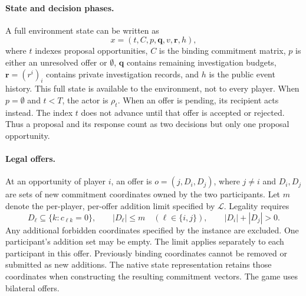 \paragraph{State and decision phases.}
A full environment state can be written as
\begin{equation}
 x=(t,C,p,\mathbf q,v,\mathbf r,h),
 \label{eq:game-full-state}
\end{equation}
where $t$ indexes proposal opportunities, $C$ is the binding commitment
matrix, $p$ is either an unresolved offer or $\emptyset$, $\mathbf q$
contains remaining investigation budgets, $\mathbf r=(r^i)_i$ contains
private investigation records, and $h$ is the public event history.
This full state is available to the environment, not to every player.
When $p=\emptyset$ and $t<T$, the actor is $\rho_t$. When an offer is
pending, its recipient acts instead. The index $t$ does not advance until
that offer is accepted or rejected. Thus a proposal and its response count
as two decisions but only one proposal opportunity.

\paragraph{Legal offers.}
At an opportunity of player $i$, an offer is
$o=(j,D_i,D_j)$, where $j\ne i$ and $D_i,D_j$ are sets of new commitment
coordinates owned by the two participants. Let $m$ denote the per-player,
per-offer addition limit specified by $\mathcal L$. Legality requires
\begin{equation}
 D_\ell\subseteq\{k:c_{\ell k}=0\},\qquad
 |D_\ell|\leq m\quad(\ell\in\{i,j\}),\qquad
 |D_i|+|D_j|>0.
 \label{eq:game-offer-legality}
\end{equation}
Any additional forbidden coordinates specified by the instance are excluded.
One participant's addition set may be empty. The limit applies separately
to each participant in this offer.
Previously binding coordinates cannot be removed or submitted as new
additions. The native state representation retains those coordinates when
constructing the resulting commitment vectors. The game uses bilateral
offers.

